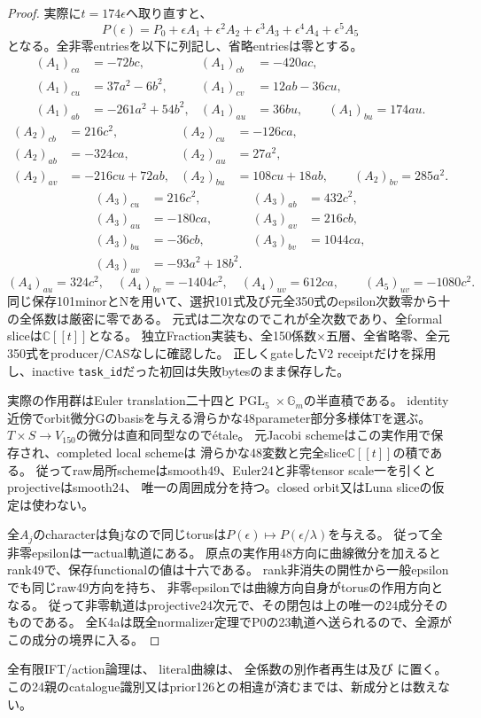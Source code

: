 \documentclass[a4paper,11pt]{ltjsarticle}
\theoremstyle{definition}
\newcommand{\PGL}{\operatorname{PGL}}
\begin{document}
\begin{proof}
実際に$t=174\epsilon$へ取り直すと、
\[
 P(\epsilon)=P_0+\epsilon A_1+\epsilon^2A_2+\epsilon^3A_3+
                      \epsilon^4A_4+\epsilon^5A_5
\]
となる。全非零entriesを以下に列記し、省略entriesは零とする。
\[
\begin{aligned}
 (A_1)_{ca}&=-72bc,&(A_1)_{cb}&=-420ac,\\
 (A_1)_{cu}&=37a^2-6b^2,&(A_1)_{cv}&=12ab-36cu,\\
 (A_1)_{ab}&=-261a^2+54b^2,&(A_1)_{au}&=36bu,\qquad (A_1)_{bu}=174au.
\end{aligned}
\]
\[
\begin{aligned}
 (A_2)_{cb}&=216c^2,&(A_2)_{cu}&=-126ca,\\
 (A_2)_{ab}&=-324ca,&(A_2)_{au}&=27a^2,\\
 (A_2)_{av}&=-216cu+72ab,&(A_2)_{bu}&=108cu+18ab,\qquad (A_2)_{bv}=285a^2.
\end{aligned}
\]
\[
\begin{aligned}
 (A_3)_{cu}&=216c^2,&(A_3)_{ab}&=432c^2,\\
 (A_3)_{au}&=-180ca,&(A_3)_{av}&=216cb,\\
 (A_3)_{bu}&=-36cb,&(A_3)_{bv}&=1044ca,\\
 (A_3)_{uv}&=-93a^2+18b^2.
\end{aligned}
\]
\[
 (A_4)_{au}=324c^2,\quad (A_4)_{bv}=-1404c^2,\quad
 (A_4)_{uv}=612ca,\qquad (A_5)_{uv}=-1080c^2.
\]
同じ保存101minorとNを用いて、選択101式及び元全350式のepsilon次数零から十の全係数は厳密に零である。
元式は二次なのでこれが全次数であり、全formal sliceは$\mathbb C[[t]]$となる。
独立Fraction実装も、全150係数×五層、全省略零、全元350式をproducer/CASなしに確認した。
正しくgateしたV2 receiptだけを採用し、inactive \texttt{task\_id}だった初回は失敗bytesのまま保存した。

実際の作用群はEuler translation二十四と$\PGL_5\times\mathbb G_m$の半直積である。
identity近傍でorbit微分Gのbasisを与える滑らかな48parameter部分多様体Tを選ぶ。
$T\times S\to V_{150}$の微分は直和同型なのでétale。
元Jacobi schemeはこの実作用で保存され、completed local schemeは
滑らかな48変数と完全slice$\mathbb C[[t]]$の積である。
従ってraw局所schemeはsmooth49、Euler24と非零tensor scale一を引くとprojectiveはsmooth24、
唯一の周囲成分を持つ。closed orbit又はLuna sliceの仮定は使わない。

全$A_j$のcharacterは負jなので同じtorusは$P(\epsilon)\mapsto P(\epsilon/\lambda)$を与える。
従って全非零epsilonは一actual軌道にある。
原点の実作用48方向に曲線微分を加えるとrank49で、保存functionalの値は十六である。
rank非消失の開性から一般epsilonでも同じraw49方向を持ち、
非零epsilonでは曲線方向自身がtorusの作用方向となる。
従って非零軌道はprojective24次元で、その閉包は上の唯一の24成分そのものである。
全K4aは既全normalizer定理でP0の23軌道へ送られるので、全源がこの成分の境界に入る。
\end{proof}
全有限IFT/action論理は、
literal曲線は、
全係数の別作者再生は及び
に置く。
この24親のcatalogue識別又はprior126との相違が済むまでは、新成分とは数えない。
\end{document}
